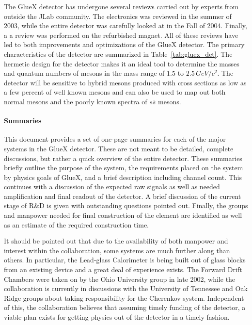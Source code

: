 \hspace{1cm}
The GlueX detector has undergone several reviews carried out by experts from
outside the JLab community. The electronics was reviewed in the summer of
2003, while the entire detector was carefully looked at in the Fall of 2004.
Finally, a a review was performed on the refurbished magnet. All of these
reviews have led to both improvements and optimizations of the GlueX
detector. The primary characteristics of the detector are summarized in 
Table~\ref{tab:gluex_det}.  The hermetic design for the detector makes it 
an ideal tool to determine the masses and quantum numbers of mesons in the 
mass range of $1.5$ to $2.5\, GeV/c^{2}$. The detector will be sensitive 
to hybrid mesons produced with cross sections as low as a few percent
of well known mesons and can also be used to map out both normal mesons and
the poorly known spectra of $s\overline{s}$ mesons.

\hspace{1cm}
\paragraph{Summaries} This document provides a set of one-page summaries for each of the 
major systems in the GlueX detector. These are not meant to be
detailed, complete discussions, but rather a quick overview of the
entire detector. These summaries briefly outline the 
purpose of the system, the requirements placed on the system by
physics goals of GlueX, and a brief description including channel 
count. This continues with  a discussion of the expected raw signals 
as well as needed amplification and final readout of the detector.
A brief discussion of the current stage of R\&D is given with 
outstanding questions pointed out. Finally, the groups and manpower
needed for final construction of the element are identified as 
well as an estimate of the required construction time. 


\hspace{1cm}
It should be pointed out that due to the availability of both manpower
and interest within the collaboration, some systems are much further
along than others. In particular, the Lead-glass Calorimeter is
being built out of glass blocks from an existing device and a great
deal of experience exists. The Forward Drift Chambers were taken on
by the Ohio University group in late 2002, while the collaboration is
currently in discussions with the University of Tennessee and Oak
Ridge groups about taking responsibility for the Cherenkov system.
Independent of this, the collaboration believes that assuming timely
funding of the detector, a viable plan exists for getting physics 
out of the detector in a timely fashion. 

